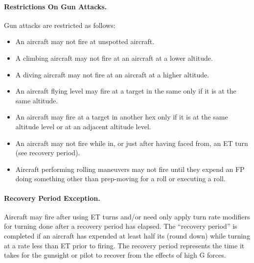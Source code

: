 \paragraph{Restrictions On Gun Attacks.} Gun attacks are restricted as follows:

\begin{itemize}
    \item An aircraft may not fire at unspotted aircraft.
    \item A climbing aircraft may not fire at an aircraft at a lower altitude.
    \item A diving aircraft may not fire at an aircraft at a higher altitude.
    \item An aircraft flying level may fire at a target in the same  only if it is at the same altitude.
    \item An aircraft may fire at a target in another hex only if it is at the same altitude level or at an adjacent altitude level.
    \item An aircraft may not fire while in, or just after having faced from, an ET turn (see recovery period).
    \item Aircraft performing rolling maneuvers may not fire until they expend an FP doing something other than prep-moving for a roll or executing a roll.
\end{itemize}


\paragraph{Recovery Period Exception.} 
\label{rule:recovery-periods}
Aircraft may fire after using ET turns and/or need only apply turn rate modifiers for turning done after a recovery period has elapsed. The “recovery period” is completed if an aircraft has expended at least half its  (round down) while turning at a rate less than ET  prior to firing. The recovery period represents the time it takes for the gunsight or pilot to recover from the effects of high G forces.

